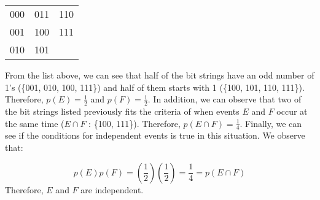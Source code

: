 \documentclass[11pt]{article}
\renewcommand{\arraystretch}{1.25}
\begin{document}
\setlength{\tabcolsep}{16pt}
\renewcommand{\arraystretch}{1.25}
\begin{table}[H]
    \begin{tabular}{c c c}
         000 & 011 & 110 \\
         001 & 100 & 111 \\
         010 & 101 &  \\
    \end{tabular}
\end{table}
From the list above, we can see that half of the bit strings have an odd number of 1's (\{001, 010, 100, 111\}) and half of them starts with 1 (\{100, 101, 110, 111\}). Therefore, $p(E) = \frac{1}{2}$ and $p(F) = \frac{1}{2}$. In addition, we can observe that two of the bit strings listed previously fits the criteria of when events $E$ and $F$ occur at the same time ($E \cap F$ : \{100, 111\}). Therefore, $p(E \cap F) = \frac{1}{4}$. Finally, we can see if the conditions for independent events is true in this situation. We observe that:

\[p(E)p(F) = \left(\frac{1}{2}\right)\left(\frac{1}{2}\right) = \frac{1}{4} = p(E \cap F)\]
Therefore, $E$ and $F$ are independent.
\end{document}
